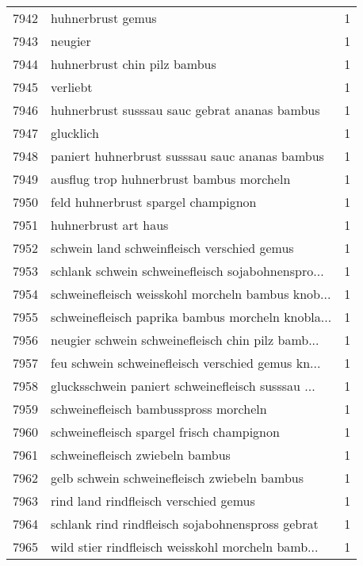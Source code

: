 \begin{tabular}{llr}
7942 &                                  huhnerbrust gemus &      1 \\
7943 &                                            neugier &      1 \\
7944 &                       huhnerbrust chin pilz bambus &      1 \\
7945 &                                           verliebt &      1 \\
7946 &      huhnerbrust susssau sauc gebrat ananas bambus &      1 \\
7947 &                                          glucklich &      1 \\
7948 &     paniert huhnerbrust susssau sauc ananas bambus &      1 \\
7949 &           ausflug trop huhnerbrust bambus morcheln &      1 \\
7950 &                feld huhnerbrust spargel champignon &      1 \\
7951 &                               huhnerbrust art haus &      1 \\
7952 &        schwein land schweinfleisch verschied gemus &      1 \\
7953 &  schlank schwein schweinefleisch sojabohnenspro... &      1 \\
7954 &  schweinefleisch weisskohl morcheln bambus knob... &      1 \\
7955 &  schweinefleisch paprika bambus morcheln knobla... &      1 \\
7956 &  neugier schwein schweinefleisch chin pilz bamb... &      1 \\
7957 &  feu schwein schweinefleisch verschied gemus kn... &      1 \\
7958 &  glucksschwein paniert schweinefleisch susssau ... &      1 \\
7959 &              schweinefleisch bambusspross morcheln &      1 \\
7960 &          schweinefleisch spargel frisch champignon &      1 \\
7961 &                    schweinefleisch zwiebeln bambus &      1 \\
7962 &       gelb schwein schweinefleisch zwiebeln bambus &      1 \\
7963 &              rind land rindfleisch verschied gemus &      1 \\
7964 &   schlank rind rindfleisch sojabohnenspross gebrat &      1 \\
7965 &  wild stier rindfleisch weisskohl morcheln bamb... &      1 \\

\end{tabular}
